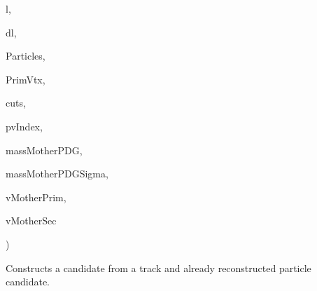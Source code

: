 {\begin{DoxyParamCaption}
\item[{kfvector\+\_\+floatv \&}]{l, }
\item[{kfvector\+\_\+floatv \&}]{dl, }
\item[{std\+::vector$<$ {\bf K\+F\+Particle} $>$ \&}]{Particles, }
\item[{std\+::vector$<$ {\bf K\+F\+Particle\+S\+I\+MD}, {\bf K\+F\+P\+Simd\+Allocator}$<$ {\bf K\+F\+Particle\+S\+I\+MD} $>$ $>$ \&}]{Prim\+Vtx, }
\item[{const float\+\_\+v $\ast$}]{cuts, }
\item[{const int\+\_\+v \&}]{pv\+Index, }
\item[{const float\+\_\+v \&}]{mass\+Mother\+P\+DG, }
\item[{const float\+\_\+v \&}]{mass\+Mother\+P\+D\+G\+Sigma, }
\item[{std\+::vector$<$ std\+::vector$<$ {\bf K\+F\+Particle} $>$ $>$ $\ast$}]{v\+Mother\+Prim, }
\item[{std\+::vector$<$ {\bf K\+F\+Particle} $>$ $\ast$}]{v\+Mother\+Sec}
\end{DoxyParamCaption}
)}\hypertarget{classKFParticleFinder_a9d0040c76e7e04dc0abdafb82612d791}{}\label{classKFParticleFinder_a9d0040c76e7e04dc0abdafb82612d791}
Constructs a candidate from a track and already reconstructed particle candidate. 
